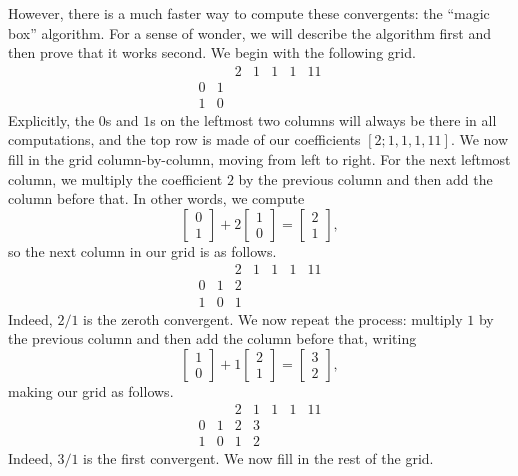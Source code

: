 \documentclass[../notes.tex]{subfiles}
\begin{document}
However, there is a much faster way to compute these convergents: the ``magic box'' algorithm. For a sense of wonder, we will describe the algorithm first and then prove that it works second. We begin with the following grid.
\[\begin{array}{cc|ccccc}
	&& 2 & 1 & 1 & 1 & 11 \\\hline
	0 & 1 \\
	1 & 0
\end{array}\]
Explicitly, the $0$s and $1$s on the leftmost two columns will always be there in all computations, and the top row is made of our coefficients $[2;1,1,1,11]$. We now fill in the grid column-by-column, moving from left to right. For the next leftmost column, we multiply the coefficient $2$ by the previous column and then add the column before that. In other words, we compute
\[\begin{bmatrix}
	0 \\ 1
\end{bmatrix}+2\begin{bmatrix}
	1 \\ 0
\end{bmatrix}=\begin{bmatrix}
	2 \\ 1
\end{bmatrix},\]
so the next column in our grid is as follows.
\[\begin{array}{cc|ccccc}
	&     & 2 & 1 & 1 & 1 & 11 \\\hline
	0 & 1 & 2 \\
	1 & 0 & 1
\end{array}\]
Indeed, $2/1$ is the zeroth convergent. We now repeat the process: multiply $1$ by the previous column and then add the column before that, writing
\[\begin{bmatrix}
	1 \\ 0
\end{bmatrix}+1\begin{bmatrix}
	2 \\ 1
\end{bmatrix}=\begin{bmatrix}
	3 \\ 2
\end{bmatrix},\]
making our grid as follows.
\[\begin{array}{cc|ccccc}
	&     & 2 & 1 & 1 & 1 & 11 \\\hline
	0 & 1 & 2 & 3 \\
	1 & 0 & 1 & 2
\end{array}\]
Indeed, $3/1$ is the first convergent. We now fill in the rest of the grid.
\end{document}
